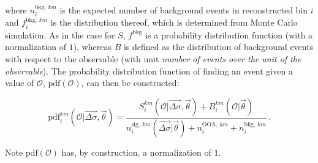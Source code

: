 % 
where $n^{\text{bkg},\,km}_i$ is the expected number of background events in reconstructed bin $i$ and $f^{\text{bkg},\,km}_i$ is the distribution thereof, which is determined from Monte Carlo simulation.
% 
As in the case for $S$, $f^\text{bkg}$ is a probability distribution function (with a normalization of $1$), whereas $B$ is defined as the distribution of background events with respect to the observable (with unit \textit{number of events over the unit of the observable}).
% 
The probability distribution function of finding an event given a value of $\mathcal{O}$, $\text{pdf}(\mathcal{O})$, can then be constructed:
% 
\begin{linenomath*}
\begin{equation}
\text{pdf}_i^{km}(\mathcal{O} | \vec{\Delta\sigma}, \vec{\theta})
= \frac{
        S^{km}_{i}( \mathcal{O} | \vec{\Delta\sigma}, \vec{\theta})
        + B^{km}_i(\mathcal{O}|\vec{\theta})
    }{
        n_i^{\text{sig},\,km}(\vec{\Delta\sigma} | \vec{\theta})
        + n^{\text{OOA},\,km}_i
        + n^{\text{bkg},\,km}_i
    }
\,.
\end{equation}
\end{linenomath*}
% 
Note $\text{pdf}(\mathcal{O})$ has, by construction, a normalization of $1$.


